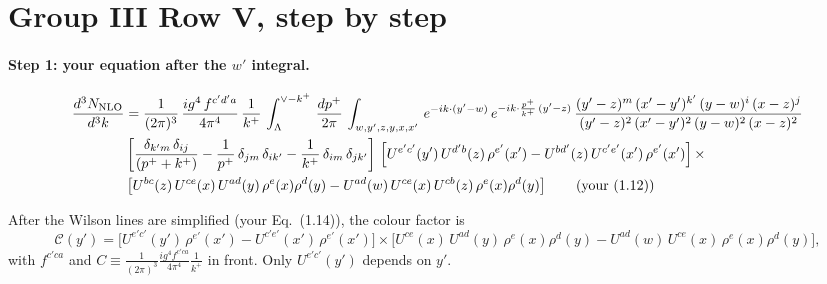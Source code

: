 \documentclass[10pt]{article}
\numberwithin{equation}{section}
\begin{document}
\section{Group III Row V, step by step}\label{sec:V}
\paragraph{Step 1: your equation after the $w'$ integral.}
\begin{align}
     \frac{d^{3}N_{\rm NLO}}{d^{3}k} & = \frac{1}{(2\pi)^{3}}\, \frac{ig^{4}\,f^{c'd'a}}{4\pi^{4}}\, \frac{1}{k^{+}}\,\int_{\Lambda}^{\vee-k^{+}}\, \frac{dp^{+}}{2\pi}\, \int_{w,y',z,y,x,x'}\, e^{-ik\cdot (y'-w)}\, e^{-ik\cdot \frac{p^{+}}{k^{+}}\,(y'-z)}\,\frac{(y'-z)^{m}\,(x'-y')^{k'}\,(y-w)^{i}\,(x-z)^{j}}{(y'-z)^{2}\,(x'-y')^{2}\,(y-w)^{2}\,(x-z)^{2}}\notag \\ & \left[\frac{\delta_{k'm}\,\delta_{ij}}{(p^{+}+k^{+})}-\frac{1}{p^{+}}\,\delta_{jm}\,\delta_{ik'}-\frac{1}{k^{+}}\, \delta_{im}\, \delta_{jk'}\right]\, \left[U^{e'c'}(y')\,U^{d'b}(z)\,\rho^{e'}(x')-U^{bd'}(z)\,U^{c'e'}(x')\,\rho^{e'}(x')\right]\times\notag \\ &  \left[U^{bc}(z)\,U^{ce}(x)\,U^{ad}(y)\,\rho^{e}(x)\rho^{d}(y)-U^{ad}(w)\,U^{ce}(x)\,U^{cb}(z)\,\rho^{e}(x)\rho^{d}(y)\right]\tag{your (1.12)}
\end{align}

After the Wilson lines are simplified (your Eq.~(1.14)), the colour factor is
\begin{equation}
\mathcal C(y')=\Big[U^{e'c'}(y')\,\rho^{e'}(x')-U^{c'e'}(x')\,\rho^{e'}(x')\Big]\times\Big[U^{ce}(x)\,U^{ad}(y)\,\rho^{e}(x)\rho^{d}(y)-U^{ad}(w)\,U^{ce}(x)\,\rho^{e}(x)\rho^{d}(y)\Big],
\label{eq:C}
\end{equation}
with $f^{c'ca}$ and $C\equiv\frac{1}{(2\pi)^{3}}\frac{ig^{4}f^{c'ca}}{4\pi^{4}}\frac{1}{k^{+}}$ in front. Only $U^{e'c'}(y')$ depends on $y'$.
\end{document}
